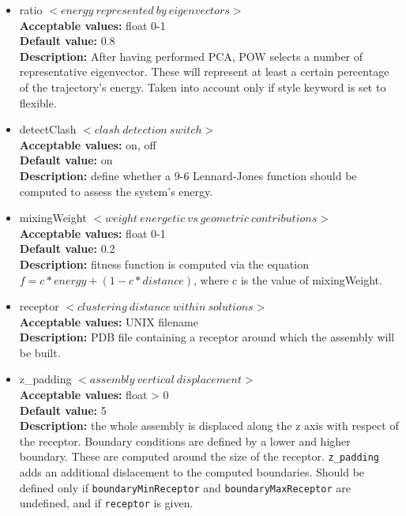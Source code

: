 \documentclass[a4paper, 12pt]{article}
\begin{document}
\begin{itemize}
\item ratio $< energy\ represented\ by\ eigenvectors >$\\
\textbf{Acceptable values:} float 0-1\\
\textbf{Default value:} 0.8\\
\textbf{Description:} After having performed PCA, POW selects a number of representative eigenvector. These will represent at least a certain percentage of the trajectory's energy. Taken into account only if style keyword is set to flexible.

\item detectClash $< clash\ detection\ switch>$\\
\textbf{Acceptable values:} on, off\\
\textbf{Default value:} on\\
\textbf{Description:} define whether a 9-6 Lennard-Jones function should be computed to assess the system's energy.

\item mixingWeight $< weight\ energetic\ vs\ geometric\ contributions>$\\
\textbf{Acceptable values:} float 0-1\\
\textbf{Default value:} 0.2\\
\textbf{Description:} fitness function is computed via the equation $f=c*energy+(1-c*distance)$, where c is the value of mixingWeight.

\item receptor $< clustering\ distance\ within\ solutions >$\\
\textbf{Acceptable values:} UNIX filename\\
\textbf{Description:} PDB file containing a receptor around which the assembly will be built.

\item z\_padding $< assembly\ vertical\ displacement>$\\
\textbf{Acceptable values:} float > 0\\
\textbf{Default value:} 5\\
\textbf{Description:} the whole assembly is displaced along the z axis with respect of the receptor. Boundary conditions are defined by a lower and higher boundary. These are computed around the size of the receptor. \texttt{z\_padding} adds an additional dislacement to the computed boundaries. Should be defined only if \texttt{boundaryMinReceptor} and \texttt{boundaryMaxReceptor} are undefined, and if \texttt{receptor} is given.


\end{itemize}
\end{document}
